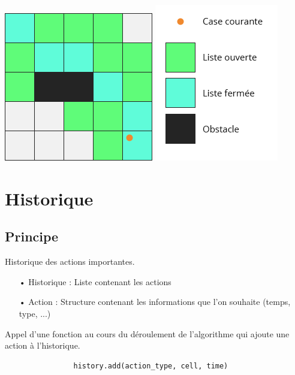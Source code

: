 \documentclass[11pt]{beamer}
\begin{document}
		\begin{frame}
			\begin{center}
				\includegraphics[scale=0.5]{images/Algo_8.png}
				\hspace{1cm}
				\includegraphics[scale=0.5]{images/Legend.png}
			\end{center}
		\end{frame}		
		
\section{Historique}
	\subsection{Principe}
		\begin{frame}[fragile]
			Historique des actions importantes.
			\begin{itemize}
				\item[•] Historique : Liste contenant les actions
				\item[•] Action : Structure contenant les informations que l'on souhaite (temps, type, ...)
			\end{itemize}
			\vspace{4mm}
			Appel d'une fonction au cours du déroulement de l'algorithme qui ajoute une action à l'historique.	 
			\begin{lstlisting}
				history.add(action_type, cell, time)
			\end{lstlisting}
		\end{frame}
		
\end{document}

